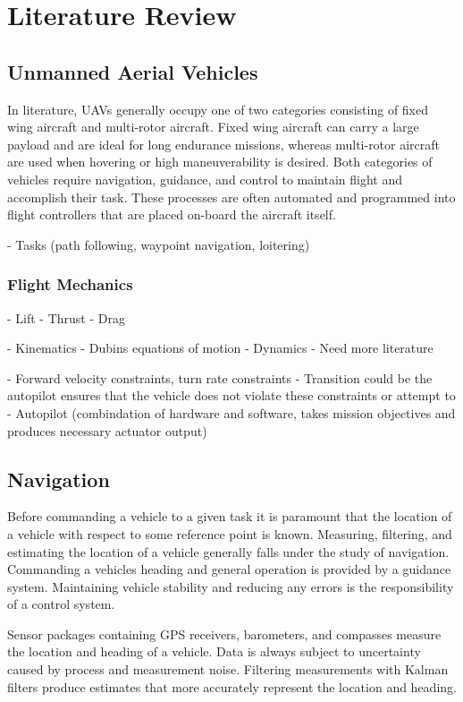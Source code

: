 \documentclass[numbered,pdftex]{ohio-etd}
\begin{document}
\chapter{Literature Review}
\section{Unmanned Aerial Vehicles}

In literature, UAVs generally occupy one of two categories consisting of fixed wing aircraft and multi-rotor aircraft. Fixed wing aircraft can carry a large payload and are ideal for long endurance missions, whereas multi-rotor aircraft are used when hovering or high maneuverability is desired. Both categories of vehicles require navigation, guidance, and control to maintain flight and accomplish their task. These processes are often automated and programmed into flight controllers that are placed on-board the aircraft itself. 

 - Tasks (path following, waypoint navigation, loitering)

\subsection{Flight Mechanics}

- Lift
- Thrust
- Drag

- Kinematics
- Dubins equations of motion
- Dynamics
- Need more literature

- Forward velocity constraints, turn rate constraints
- Transition could be the autopilot ensures that the vehicle does not violate these constraints or attempt to
- Autopilot (combindation of hardware and software, takes mission objectives and produces necessary actuator output)



\section{Navigation}
Before commanding a vehicle to a given task it is paramount that the location of a vehicle with respect to some reference point is known. Measuring, filtering, and estimating the location of a vehicle generally falls under the study of navigation. Commanding a vehicles heading and general operation is provided by a guidance system. Maintaining vehicle stability and reducing any errors is the responsibility of a control system. 

Sensor packages containing GPS receivers, barometers, and compasses measure the location and heading of a vehicle. Data is always subject to uncertainty caused by process and measurement noise. Filtering measurements with Kalman filters produce estimates that more accurately represent the location and heading.
\end{document}
